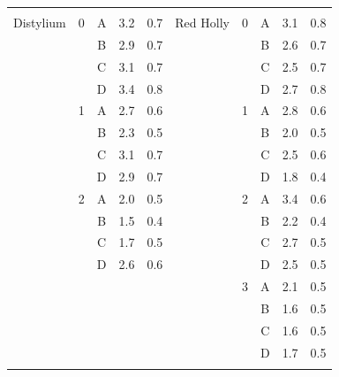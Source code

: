 \documentclass[12pt]{article}
\begin{document}
\begin{table}[!]
\begin{tabular}{cccccccccc}
					&		&		& 		&					&				&		&		& 		&		\\
Distylium				&	0	&	A	& 	3.2	&	0.7				&Red Holly			&	0	&	A	& 	3.1	&	0.8	\\
					&		&	B	& 	2.9	&	0.7				&				&		&	B	& 	2.6	&	0.7	\\
					&		&	C	& 	3.1	&	0.7				&				&		&	C	& 	2.5	&	0.7	\\
					&		&	D	& 	3.4	&	0.8				&				&		&	D	& 	2.7	&	0.8	\\
					&	1	&	A	& 	2.7	&	0.6				&				&	1	&	A	& 	2.8	&	0.6	\\
					&		&	B	& 	2.3	&	0.5				&				&		&	B	& 	2.0	&	0.5	\\
					&		&	C	& 	3.1	&	0.7				&				&		&	C	& 	2.5	&	0.6	\\
					&		&	D	& 	2.9	&	0.7				&				&		&	D	& 	1.8	&	0.4	\\
					&	2	&	A	& 	2.0	&	0.5				&				&	2	&	A	& 	3.4	&	0.6	\\
					&		&	B	& 	1.5	&	0.4				&				&		&	B	& 	2.2	&	0.4	\\
					&		&	C	& 	1.7	&	0.5				&				&		&	C	& 	2.7	&	0.5	\\
					&		&	D	& 	2.6	&	0.6				&				&		&	D	& 	2.5	&	0.5	\\
					&		&		& 		&					&				&	3	&	A	& 	2.1	&	0.5	\\
					&		&		& 		&					&				&		&	B	& 	1.6	&	0.5	\\
					&		&		& 		&					&				&		&	C	& 	1.6	&	0.5	\\
					&		&		& 		&					&				&		&	D	& 	1.7	&	0.5	\\
\\[0.05cm]
\hline														
\end{tabular}
\end{table}
\end{document}
